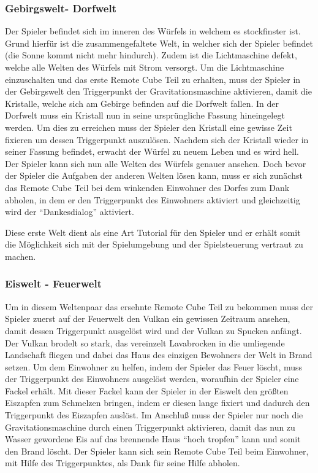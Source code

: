 \subsubsection{Gebirgswelt- Dorfwelt}
Der Spieler befindet sich im inneren des Würfels in welchem es stockfinster ist. Grund hierfür ist die zusammengefaltete Welt, in welcher sich der Spieler befindet (die Sonne kommt nicht mehr hindurch). Zudem ist die Lichtmaschine defekt, welche alle Welten des Würfels mit Strom versorgt. Um die Lichtmaschine einzuschalten und das erste Remote Cube Teil zu erhalten, muss der Spieler in der Gebirgswelt den Triggerpunkt der Gravitationsmaschine aktivieren, damit die Kristalle, welche sich am Gebirge befinden auf die Dorfwelt fallen. In der Dorfwelt muss ein Kristall nun in seine ursprüngliche Fassung hineingelegt werden. Um dies zu erreichen muss der Spieler den Kristall eine gewisse Zeit fixieren um dessen Triggerpunkt auszulösen. Nachdem sich der Kristall wieder in seiner Fassung befindet, erwacht der Würfel zu neuem Leben und es wird hell. Der Spieler kann sich nun alle Welten des Würfels genauer ansehen. Doch bevor der Spieler die Aufgaben der anderen Welten lösen kann, muss er sich zunächst das Remote Cube Teil bei dem winkenden Einwohner des Dorfes zum Dank abholen, in dem er den Triggerpunkt des Einwohners aktiviert und gleichzeitig wird der \enquote{Dankesdialog} aktiviert.


Diese erste Welt dient als eine Art Tutorial für den Spieler und er erhält somit die Möglichkeit sich mit der Spielumgebung und der Spielsteuerung vertraut zu machen.

\subsubsection{Eiswelt - Feuerwelt}
Um in diesem Weltenpaar das ersehnte Remote Cube Teil zu bekommen muss der Spieler zuerst auf der Feuerwelt den Vulkan ein gewissen Zeitraum ansehen, damit dessen Triggerpunkt ausgelöst wird und der Vulkan zu Spucken anfängt. Der Vulkan brodelt so stark, das vereinzelt Lavabrocken in die umliegende Landschaft fliegen und dabei das Haus des einzigen Bewohners der Welt in Brand setzen. Um dem Einwohner zu helfen, indem der Spieler das Feuer löscht, muss der Triggerpunkt des Einwohners ausgelöst werden, woraufhin der Spieler eine Fackel erhält. Mit dieser Fackel kann der Spieler in der Eiswelt den größten Eiszapfen zum Schmelzen bringen, indem er diesen lange fixiert und dadurch den Triggerpunkt des Eiszapfen auslöst. Im Anschluß muss der Spieler nur noch die Gravitationsmaschine durch einen Triggerpunkt aktivieren, damit das nun zu Wasser gewordene Eis auf das brennende Haus \enquote{hoch tropfen} kann und somit den Brand löscht. Der Spieler kann sich sein Remote Cube Teil beim Einwohner, mit Hilfe des Triggerpunktes, als Dank für seine Hilfe abholen.

